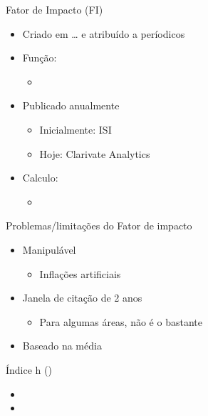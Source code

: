 \documentclass[bigger]{beamer}
\begin{document}
\begin{frame}[label={sec:org0d386ee}]{Fator de Impacto (FI)}
\begin{itemize}
\item Criado em \ldots{} e atribuído a períodicos

\item Função:
\begin{itemize}
\item 
\end{itemize}

\item Publicado anualmente
\begin{itemize}
\item Inicialmente: ISI
\item Hoje: Clarivate Analytics
\end{itemize}

\item Calculo:
\begin{itemize}
\item 
\end{itemize}
\end{itemize}
\end{frame}

\begin{frame}[label={sec:org2109b85}]{Problemas/limitações do Fator de impacto}
\begin{itemize}
\item Manipulável
\begin{itemize}
\item Inflações artificiais
\end{itemize}

\item Janela de citação de 2 anos
\begin{itemize}
\item Para algumas áreas, não é o bastante
\end{itemize}

\item Baseado na média
\end{itemize}
\end{frame}


\begin{frame}[label={sec:orgfc84c53}]{Índice h ()}
\begin{itemize}
\item 

\item 
\end{itemize}
\end{frame}
\end{document}

